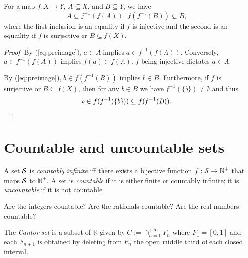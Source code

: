 \begin{lem}
  \label{lem:preimageSubsetIdentites}
  For a map $f: X\rightarrow Y$, $A\subseteq X$,
  and $B\subseteq Y$,
  we have
  \begin{equation}
    \label{eq:preimageSubsetIdentites}
    A \subseteq f^{-1}(f(A)),\
    f(f^{-1}(B))\subseteq B,
  \end{equation}
  where the first inclusion
  is an equality if $f$ is injective 
  and the second is an equaility
  if $f$ is surjective or $B\subseteq f(X)$.
\end{lem}
\begin{proof}
  By (\ref{eq:preimage}), $a\in A$ implies
  $a\in f^{-1}(f(A))$.
  Conversely, $a\in f^{-1}(f(A))$ implies
   $f(a)\in f(A)$.
   $f$ being injective dictates $a\in A$.

  By (\ref{eq:preimage}), $b\in f(f^{-1}(B))$ implies
  $b\in B$.
  Furthermore, if $f$ is surjective or $B\subseteq f(X)$,
  then for any $b\in B$ we have $f^{-1}(\{b\})\ne \emptyset$
  and thus
  \begin{displaymath}
    b\in f(f^{-1}(\{b\})) \subseteq f(f^{-1}(B)).\qedhere
  \end{displaymath}
\end{proof}


\section{Countable and uncountable sets}
\label{sec:count-unco-sets}

\begin{defn}
  \label{def:countability}
  A set ${\cal S}$ is \emph{countably infinite}
   iff there exists a bijective function
   $f:{\cal S}\rightarrow \mathbb{N}^+$
   that maps ${\cal S}$ to $\mathbb{N}^+$.
  A set is \emph{countable}
  if it is either finite or countably infinite;
  it is \emph{uncountable}
  if it is not countable.
\end{defn}

\begin{exc}
  Are the integers countable?
  Are the rationals countable?
  Are the real numbers countable?
\end{exc}

\begin{defn}
  \label{def:CantorSet}
  The \emph{Cantor set} is a subset of $\mathbb{R}$
  given by $C:=\cap_{n=1}^{+\infty} F_n$
  where $F_1=[0,1]$
  and each $F_{n+1}$ is obtained
  by deleting from $F_n$ the open middle third
  of each closed interval. %
\end{defn}

